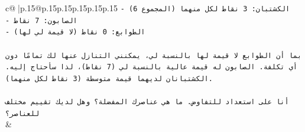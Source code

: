 \documentclass{article}
\begin{document}
{\begin{supertabular}{c@{$\;$}|p{.15\linewidth}@{}p{.15\linewidth}p{.15\linewidth}p{.15\linewidth}p{.15\linewidth}p{.15\linewidth}}
{{{\texttt{{-} الكشتبان: 3 نقاط لكل منهما (المجموع 6)} \\
\texttt{{-} الصابون: 7 نقاط} \\
\texttt{{-} الطوابع: 0 نقاط (لا قيمة لي لها)} \\
\\ 
\texttt{بما أن الطوابع لا قيمة لها بالنسبة لي، يمكنني التنازل عنها لك تمامًا دون أي تكلفة. الصابون له قيمة عالية بالنسبة لي (7 نقاط)، لذا سأحتاج إليه. الكشتبانان لديهما قيمة متوسطة (3 نقاط لكل منهما).} \\
\\ 
\texttt{أنا على استعداد للتفاوض. ما هي عناصرك المفضلة؟ وهل لديك تقييم مختلف للعناصر؟} \\
            }
        }
    }
    & \\ \\


\end{supertabular}}
\end{document}
